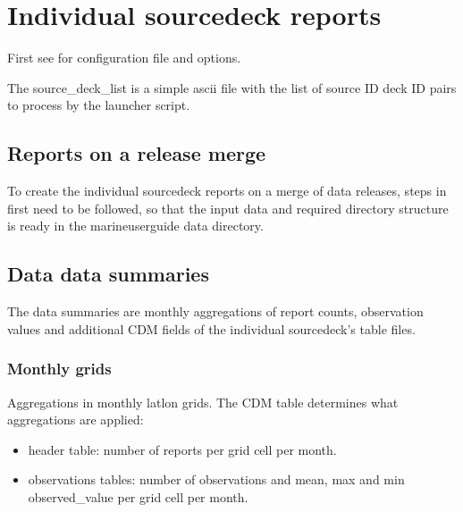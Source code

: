 \documentclass[letterpaper,10pt,english]{sphinxmanual}
\begin{document}
\chapter{Individual source\sphinxhyphen{}deck reports}
\label{\detokenize{index:individual-source-deck-reports}}\label{\detokenize{index:source-deck-reports}}
First see {\hyperref[\detokenize{index:appendix-sd}]{}} for configuration file and options.

The source\_deck\_list is a simple ascii file with the list of source ID \sphinxhyphen{} deck ID
pairs to process by the launcher script.


\section{Reports on a release merge}
\label{\detokenize{index:reports-on-a-release-merge}}
To create the individual source\sphinxhyphen{}deck reports on a merge of data releases, steps
in {\hyperref[\detokenize{index:init-mug}]{}} first need to be followed, so that the input data and
required directory structure is ready in the marine\sphinxhyphen{}user\sphinxhyphen{}guide data directory.


\section{Data data summaries}
\label{\detokenize{index:data-data-summaries}}
The data summaries are monthly aggregations of report counts, observation values
and additional CDM fields of the individual source\sphinxhyphen{}deck’s table files.


\subsection{Monthly grids}
\label{\detokenize{index:monthly-grids-sd-section}}\label{\detokenize{index:id3}}
Aggregations in monthly lat\sphinxhyphen{}lon grids. The CDM table determines what
aggregations are applied:
\begin{itemize}
\item {} 
header table: number of reports per grid cell per month.

\item {} 
observations tables: number of observations and mean, max and min
observed\_value per grid cell per month.

\end{itemize}
\end{document}

